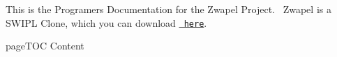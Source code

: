This is the Programer\textquotesingle{}s Documentation for the Zwapel Project.~\newline
 Zwapel is a SWIPL Clone, which you can download \href{}{\texttt{ here}}.


\begin{DoxyItemize}
\item page\+TOC Content 
\end{DoxyItemize}